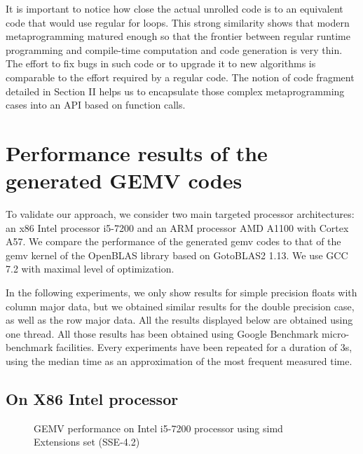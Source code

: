 \documentclass[../main]{subfiles}
\begin{document}
It is important to notice how close the actual unrolled code
is to an equivalent code that would use regular for loops. This
strong similarity shows that modern metaprogramming matured
enough so that the frontier between regular runtime programming
and compile-time computation and code generation is
very thin. The effort to fix bugs in such code or to upgrade
it to new algorithms is comparable to the effort required
by a regular code. The notion of code fragment detailed
in Section II helps us to encapsulate those complex metaprogramming
cases into an API based on function calls.

\section{
  Performance results of the generated GEMV codes
}

To validate our approach, we consider two main targeted
processor architectures: an x86 Intel processor i5-7200 and an
ARM processor AMD A1100 with Cortex A57. We compare
the performance of the generated \gls{gemv} codes to that of the
\gls{gemv} kernel of the OpenBLAS library based on GotoBLAS2 1.13\cite{hpcs21}.
We use GCC 7.2\cite{hpcs22} with maximal level of optimization.

In the following experiments, we only show results
for simple precision floats with column major data, but we
obtained similar results for the double precision case, as well
as the row major data. All the results displayed below are
obtained using one thread. All those results has been obtained
using Google Benchmark micro-benchmark facilities. Every
experiments have been repeated for a duration of 3s, using
the median time as an approximation of the most frequent
measured time.

\subsection{
  On X86 Intel processor
}

\begin{figure}[h]
\fontsize{8}{10}\selectfont

\caption{
  GEMV performance on Intel i5-7200 processor using \gls{simd}
  Extensions set (SSE-4.2)
}
\label{fig:gemv-avx-sse}
\end{figure}
\end{document}
